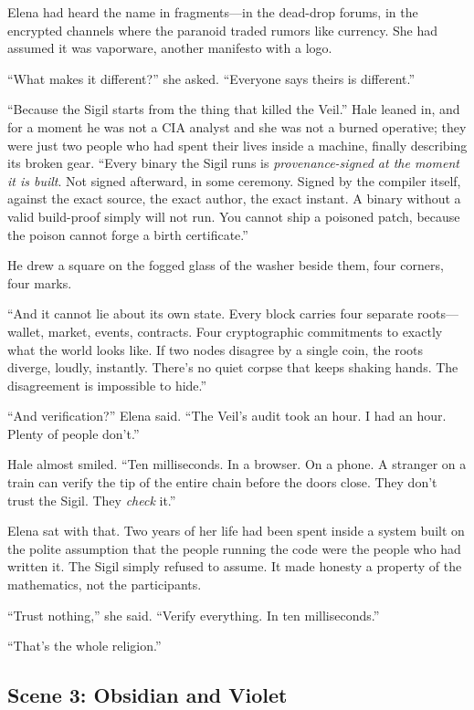 \documentclass[12pt,letterpaper]{book}
\begin{document}
Elena had heard the name in fragments---in the dead-drop forums, in the encrypted channels where the paranoid traded rumors like currency. She had assumed it was vaporware, another manifesto with a logo.

``What makes it different?'' she asked. ``Everyone says theirs is different.''

``Because the Sigil starts from the thing that killed the Veil.'' Hale leaned in, and for a moment he was not a CIA analyst and she was not a burned operative; they were just two people who had spent their lives inside a machine, finally describing its broken gear. ``Every binary the Sigil runs is \emph{provenance-signed at the moment it is built}. Not signed afterward, in some ceremony. Signed by the compiler itself, against the exact source, the exact author, the exact instant. A binary without a valid build-proof simply will not run. You cannot ship a poisoned patch, because the poison cannot forge a birth certificate.''

He drew a square on the fogged glass of the washer beside them, four corners, four marks.

``And it cannot lie about its own state. Every block carries four separate roots---wallet, market, events, contracts. Four cryptographic commitments to exactly what the world looks like. If two nodes disagree by a single coin, the roots diverge, loudly, instantly. There's no quiet corpse that keeps shaking hands. The disagreement is impossible to hide.''

``And verification?'' Elena said. ``The Veil's audit took an hour. I had an hour. Plenty of people don't.''

Hale almost smiled. ``Ten milliseconds. In a browser. On a phone. A stranger on a train can verify the tip of the entire chain before the doors close. They don't trust the Sigil. They \emph{check} it.''

Elena sat with that. Two years of her life had been spent inside a system built on the polite assumption that the people running the code were the people who had written it. The Sigil simply refused to assume. It made honesty a property of the mathematics, not the participants.

``Trust nothing,'' she said. ``Verify everything. In ten milliseconds.''

``That's the whole religion.''

\hypertarget{scene-3-obsidian-and-violet}{%
\subsection{Scene 3: Obsidian and Violet}\label{scene-3-obsidian-and-violet}}
\end{document}
